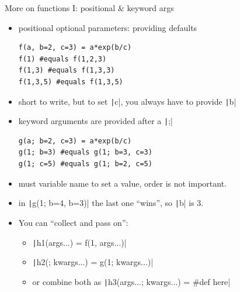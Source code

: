 \documentclass[aspectratio=169, 11pt, handout]{beamer}
\begin{document}
    \begin{frame}[fragile]{More on functions I: positional \& keyword args}
        \begin{itemize}
            \item \alert{positional optional} parameters: providing defaults
        \begin{verbatim}
f(a, b=2, c=3) = a*exp(b/c)
f(1) #equals f(1,2,3)
f(1,3) #equals f(1,3,3)
f(1,3,5) #equals f(1,3,5)
        \end{verbatim}
        \item short to write, \alert{but} to set \texttt|c|, you always have to provide \texttt|b|
            \pause
            \item \alert{keyword arguments} are provided after a \texttt|;|
        \begin{verbatim}
g(a; b=2, c=3) = a*exp(b/c)
g(1; b=3) #equals g(1; b=3, c=3)
g(1; c=5) #equals g(1; b=2, c=5)
        \end{verbatim}
            \item must variable name to set a value, order is \alert{not} important.
            \pause
            \item in \texttt|g(1; b=4, b=3)| the last one “wins”, so \texttt|b| is 3.
            \pause
        \item You can “collect and pass on”:
            \begin{itemize}
                \item \texttt|h1(args...) = f(1, args...)|
                \item \texttt|h2(; kwargs...) = g(1; kwargs...)|
                \item or combine both as \texttt|h3(args...; kwargs...) = #def here|
            \end{itemize}
        \end{itemize}
    \end{frame}
\end{document}
